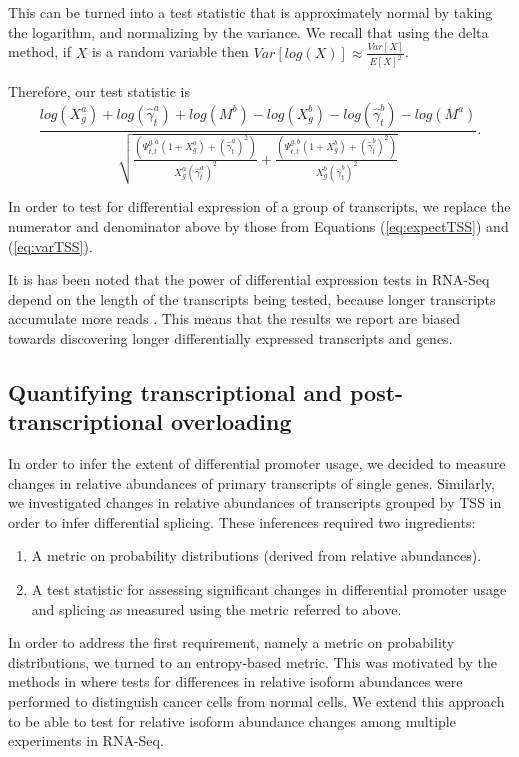 \documentclass[12pt]{amsart}
\theoremstyle{definition}
\begin{document}
This can be turned into a test statistic that is approximately normal by
taking the logarithm, and normalizing by the variance. We recall that using
the delta method, if $X$ is a random variable then $Var[log(X)] \approx
\frac{Var[X]}{E[X]^2}$.

Therefore, our test statistic is 
\begin{equation}
\frac{log(X^a_g)+log(\hat{\gamma}^a_t)+log(M^b)-log(X^b_g)-log(\hat{\gamma}^b_t)-log(M^a)}
{ \sqrt{\frac{\left( \Psi^{g,a}_{t,t}(1+X^a_{g}) + (\hat{\gamma}^a_t)^2\right)}{X^a_g \left(\hat{\gamma}^a_t \right)^2}+
\frac{\left( \Psi^{g,b}_{t,t}(1+X^b_{g}) + (\hat{\gamma}^b_t)^2\right)}{X^b_{g}\left(  \hat{\gamma}^b_t\right)^2}    }  }.
\end{equation}

In order to test for differential expression of a group of transcripts, we
replace the numerator and denominator above by those from Equations
(\ref{eq:expectTSS}) and (\ref{eq:varTSS}).

It is has been noted that the power of differential expression tests in RNA-Seq depend on the length of the transcripts being tested, because longer transcripts accumulate more reads \cite{Oshlack2009}. This means that the results we report are biased towards discovering longer differentially expressed transcripts and genes.

\subsection{Quantifying transcriptional and post-transcriptional overloading}

In order to infer the extent of differential promoter usage, we
decided to measure changes in relative abundances of primary
transcripts of single genes. Similarly, we investigated changes in
relative abundances of transcripts grouped by TSS in order to infer
differential splicing.  These inferences required two ingredients: 
\begin{enumerate}
\item A metric on probability distributions (derived from relative
  abundances).
\item A test statistic for assessing significant changes in
  differential promoter usage and splicing as measured using the
  metric referred to above. 
\end{enumerate}

In order to address the first requirement, namely a metric on
probability distributions, we turned to an entropy-based metric. This
was motivated by the methods in \cite{Ritchie2008} where tests for
differences in relative isoform abundances were performed to
distinguish cancer cells from normal cells. We extend
this approach to be able to test for relative isoform abundance changes among multiple
experiments in RNA-Seq.
\end{document}
